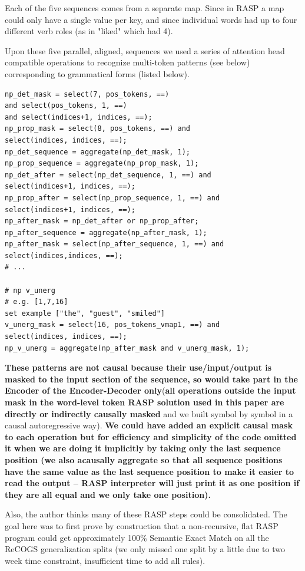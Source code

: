 \documentclass[11pt]{article}
\begin{document}
Each of the five sequences comes from a separate map. Since in RASP a map could only have a single value per key, and since individual words had up to four different verb roles (as in "liked" which had 4).

Upon these five parallel, aligned, sequences we used a series of attention head compatible operations to recognize multi-token patterns (see below) corresponding to grammatical forms (listed below). 

\begin{tiny}
\begin{verbatim}
np_det_mask = select(7, pos_tokens, ==) 
and select(pos_tokens, 1, ==) 
and select(indices+1, indices, ==);
np_prop_mask = select(8, pos_tokens, ==) and 
select(indices, indices, ==);
np_det_sequence = aggregate(np_det_mask, 1);
np_prop_sequence = aggregate(np_prop_mask, 1);
np_det_after = select(np_det_sequence, 1, ==) and 
select(indices+1, indices, ==);
np_prop_after = select(np_prop_sequence, 1, ==) and 
select(indices+1, indices, ==);
np_after_mask = np_det_after or np_prop_after;
np_after_sequence = aggregate(np_after_mask, 1);
np_after_mask = select(np_after_sequence, 1, ==) and 
select(indices,indices, ==);
# ...

# np v_unerg
# e.g. [1,7,16]
set example ["the", "guest", "smiled"]
v_unerg_mask = select(16, pos_tokens_vmap1, ==) and 
select(indices, indices, ==);
np_v_unerg = aggregate(np_after_mask and v_unerg_mask, 1);
\end{verbatim}
\end{tiny}

\textbf{These patterns are not causal because their use/input/output is masked to the input section of the sequence, so would take part in the Encoder of the Encoder-Decoder only}(\textbf{all operations outside the input mask in the word-level token RASP solution used in this paper are directly or indirectly causally masked} and we built symbol by symbol in a causal autoregressive way). \textbf{We could have added an explicit causal mask to each operation but for efficiency and simplicity of the code omitted it when we are doing it implicitly by taking only the last sequence position (we also acausally aggregate so that all sequence positions have the same value as the last sequence position to make it easier to read the output -- RASP interpreter will just print it as one position if they are all equal and we only take one position).}

Also, the author thinks many of these RASP steps could be consolidated. The goal here was to first prove by construction that a non-recursive, flat RASP program could get approximately 100\% Semantic Exact Match on all the ReCOGS generalization splits (we only missed one split by a little due to two week time constraint, insufficient time to add all rules).
\end{document}
